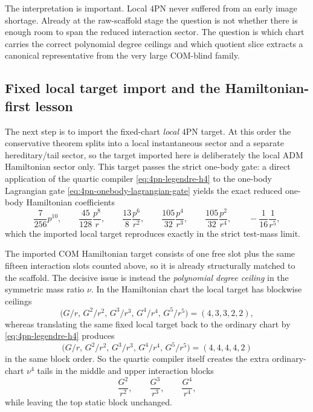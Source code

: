 \documentclass[11pt]{article}
\begin{document}
The interpretation is important.  Local $4$PN never suffered from an early image
shortage.  Already at the raw-scaffold stage the question is not whether there
is enough room to span the reduced interaction sector.  The question is which
chart carries the correct polynomial degree ceilings and which quotient slice
extracts a canonical representative from the very large COM-blind family.

\subsection{Fixed local target import and the Hamiltonian-first lesson}
\label{sec:local-target-import}

The next step is to import the fixed-chart \emph{local} $4$PN target.  At this
order the conservative theorem splits into a local instantaneous sector and a
separate hereditary/tail sector, so the target imported here is deliberately the
local ADM Hamiltonian sector only.  This target passes the strict one-body gate:
a direct application of the quartic compiler \eqref{eq:4pn-legendre-h4} to the
one-body Lagrangian gate \eqref{eq:4pn-onebody-lagrangian-gate} yields the exact
reduced one-body Hamiltonian coefficients
\begin{equation}
\frac{7}{256}p^{10},
\qquad
\frac{45}{128}\frac{p^8}{r},
\qquad
\frac{13}{8}\frac{p^6}{r^2},
\qquad
\frac{105}{32}\frac{p^4}{r^3},
\qquad
\frac{105}{32}\frac{p^2}{r^4},
\qquad
-\frac{1}{16}\frac{1}{r^5},
\label{eq:4pn-local-onebody-hamiltonian-gate}
\end{equation}
which the imported local target reproduces exactly in the strict test-mass
limit.

The imported COM Hamiltonian target consists of one free slot plus the same
fifteen interaction slots counted above, so it is already structurally matched
to the scaffold.  The decisive issue is instead the \emph{polynomial degree
ceiling} in the symmetric mass ratio $\nu$.  In the Hamiltonian chart the local
target has blockwise ceilings
\begin{equation}
\bigl(G/r,\,G^2/r^2,\,G^3/r^3,\,G^4/r^4,\,G^5/r^5\bigr)
=
(4,3,3,2,2),
\label{eq:4pn-local-hamiltonian-degree-ceilings}
\end{equation}
whereas translating the same fixed local target back to the ordinary chart by
\eqref{eq:4pn-legendre-h4} produces
\begin{equation}
\bigl(G/r,\,G^2/r^2,\,G^3/r^3,\,G^4/r^4,\,G^5/r^5\bigr)
=
(4,4,4,4,2)
\label{eq:4pn-local-ordinary-degree-ceilings}
\end{equation}
in the same block order.  So the quartic compiler itself creates the extra
ordinary-chart $\nu^4$ tails in the middle and upper interaction blocks
\[
\frac{G^2}{r^2},
\qquad
\frac{G^3}{r^3},
\qquad
\frac{G^4}{r^4},
\]
while leaving the top static block unchanged.
\end{document}
